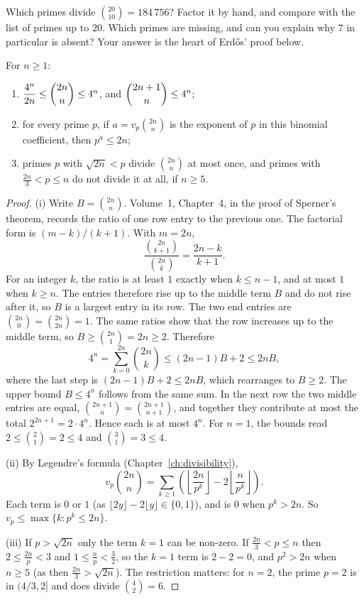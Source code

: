 \begin{think}
Which primes divide $\binom{20}{10}=184\,756$? Factor it by hand, and compare with the list of primes up to $20$. Which primes are missing, and can you explain why $7$ in particular is absent? Your answer is the heart of Erd\H{o}s' proof below.
\end{think}

\begin{lemma}\label{lem:binom}
For $n\ge1$:
\begin{enumerate}[label=(\roman*)]
\item $\dfrac{4^n}{2n}\le\dbinom{2n}n\le4^n$, and $\dbinom{2n+1}n\le4^n$;
\item for every prime $p$, if $a=v_p\binom{2n}n$ is the exponent of $p$ in this binomial coefficient, then $p^a\le2n$;
\item primes $p$ with $\sqrt{2n}<p$ divide $\binom{2n}n$ at most once, and primes with $\frac{2n}3<p\le n$ do not divide it at all, if $n\ge5$.
\end{enumerate}
\end{lemma}
\begin{proof}
(i) Write $B=\binom{2n}n$. Volume~1, Chapter~4, in the proof of Sperner's theorem, records the ratio of one row entry to the previous one. The factorial form is $(m-k)/(k+1)$. With $m=2n$,
\[
\frac{\binom{2n}{k+1}}{\binom{2n}k}=\frac{2n-k}{k+1}.
\]
For an integer $k$, the ratio is at least $1$ exactly when $k\le n-1$, and at most $1$ when $k\ge n$. The entries therefore rise up to the middle term $B$ and do not rise after it, so $B$ is a largest entry in its row. The two end entries are $\binom{2n}0=\binom{2n}{2n}=1$. The same ratios show that the row increases up to the middle term, so $B\ge\binom{2n}1=2n\ge2$. Therefore
\[
4^n=\sum_{k=0}^{2n}\binom{2n}k\le (2n-1)B+2\le2nB,
\]
where the last step is $(2n-1)B+2\le2nB$, which rearranges to $B\ge2$. The upper bound $B\le4^n$ follows from the same sum. In the next row the two middle entries are equal, $\binom{2n+1}n=\binom{2n+1}{n+1}$, and together they contribute at most the total $2^{2n+1}=2\cdot4^n$. Hence each is at most $4^n$. For $n=1$, the bounds read $2\le\binom21=2\le4$ and $\binom31=3\le4$.

(ii) By Legendre's formula (Chapter~\ref{ch:divisibility}),
\[v_p\binom{2n}n=\sum_{k\ge1}\left(\left\lfloor\frac{2n}{p^k}\right\rfloor-2\left\lfloor\frac n{p^k}\right\rfloor\right).\]
Each term is $0$ or $1$ (as $\lfloor2y\rfloor-2\lfloor y\rfloor\in\{0,1\}$), and is $0$ when $p^k>2n$. So $v_p\le\max\{k:p^k\le2n\}$.

(iii) If $p>\sqrt{2n}$ only the term $k=1$ can be non-zero. If $\frac{2n}3<p\le n$ then $2\le\frac{2n}p<3$ and $1\le\frac np<\frac32$, so the $k=1$ term is $2-2=0$, and $p^2>2n$ when $n\ge5$ (as then $\frac{2n}3>\sqrt{2n}$). The restriction matters: for $n=2$, the prime $p=2$ is in $(4/3,2]$ and does divide $\binom42=6$.
\end{proof}

